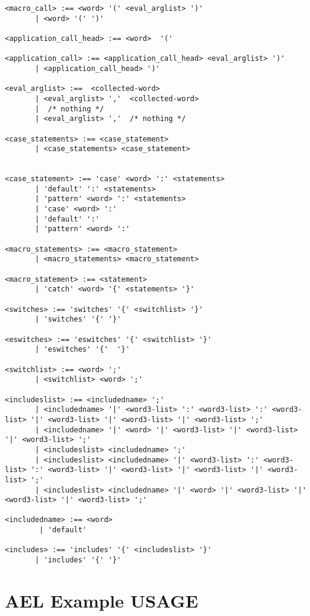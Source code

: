{\begin{verbatim}
<macro_call> :== <word> '(' <eval_arglist> ')'
       | <word> '(' ')'

<application_call_head> :== <word>  '('

<application_call> :== <application_call_head> <eval_arglist> ')'
       | <application_call_head> ')'

<eval_arglist> :==  <collected-word>
       | <eval_arglist> ','  <collected-word>
       |  /* nothing */
       | <eval_arglist> ','  /* nothing */

<case_statements> :== <case_statement>
       | <case_statements> <case_statement>


<case_statement> :== 'case' <word> ':' <statements>
       | 'default' ':' <statements>
       | 'pattern' <word> ':' <statements>
       | 'case' <word> ':'
       | 'default' ':'
       | 'pattern' <word> ':'

<macro_statements> :== <macro_statement>
       | <macro_statements> <macro_statement>

<macro_statement> :== <statement>
       | 'catch' <word> '{' <statements> '}'

<switches> :== 'switches' '{' <switchlist> '}'
       | 'switches' '{' '}'

<eswitches> :== 'eswitches' '{' <switchlist> '}'
       | 'eswitches' '{'  '}'

<switchlist> :== <word> ';'
       | <switchlist> <word> ';'

<includeslist> :== <includedname> ';'
       | <includedname> '|' <word3-list> ':' <word3-list> ':' <word3-list> '|' <word3-list> '|' <word3-list> '|' <word3-list> ';'
       | <includedname> '|' <word> '|' <word3-list> '|' <word3-list> '|' <word3-list> ';'
       | <includeslist> <includedname> ';'
       | <includeslist> <includedname> '|' <word3-list> ':' <word3-list> ':' <word3-list> '|' <word3-list> '|' <word3-list> '|' <word3-list> ';'
       | <includeslist> <includedname> '|' <word> '|' <word3-list> '|' <word3-list> '|' <word3-list> ';'

<includedname> :== <word>
        | 'default'

<includes> :== 'includes' '{' <includeslist> '}'
       | 'includes' '{' '}'

\end{verbatim}


\section{AEL Example USAGE}

}
